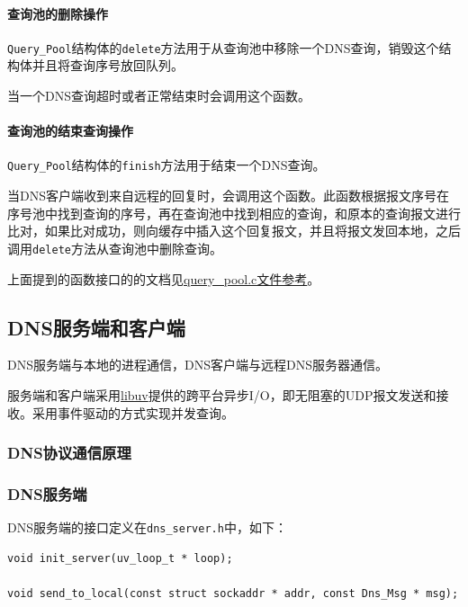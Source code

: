 \documentclass[lang=cn,11pt,a4paper,cite=authornum]{paper}
\begin{document}
\paragraph{查询池的删除操作}

\texttt{Query_Pool}结构体的\texttt{delete}方法用于从查询池中移除一个DNS查询，销毁这个结构体并且将查询序号放回队列。

当一个DNS查询超时或者正常结束时会调用这个函数。

\paragraph{查询池的结束查询操作}

\texttt{Query_Pool}结构体的\texttt{finish}方法用于结束一个DNS查询。

当DNS客户端收到来自远程的回复时，会调用这个函数。此函数根据报文序号在序号池中找到查询的序号，再在查询池中找到相应的查询，和原本的查询报文进行比对，如果比对成功，则向缓存中插入这个回复报文，并且将报文发回本地，之后调用\texttt{delete}方法从查询池中删除查询。

上面提到的函数接口的的文档见\href{run:./APIdoc/query__pool_8c.html}{query\_pool.c文件参考}。

\subsection{DNS服务端和客户端}

DNS服务端与本地的进程通信，DNS客户端与远程DNS服务器通信。

服务端和客户端采用\href{https://libuv.org/}{libuv}提供的跨平台异步I/O，即无阻塞的UDP报文发送和接收。采用事件驱动的方式实现并发查询。

\subsubsection{DNS协议通信原理}

\subsubsection{DNS服务端}

DNS服务端的接口定义在\texttt{dns_server.h}中，如下：

\begin{code}
\begin{verbatim}
void init_server(uv_loop_t * loop);

void send_to_local(const struct sockaddr * addr, const Dns_Msg * msg);
\end{verbatim}
\end{code}
\end{document}
